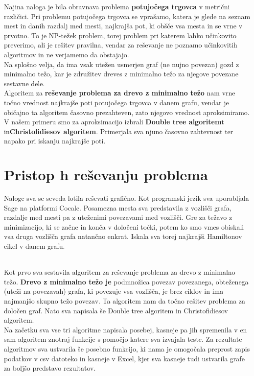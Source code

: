 \documentclass[12pt,a4paper]{amsart}
\theoremstyle{definition} %
\theoremstyle{plain} %
\begin{document}
Najina naloga je bila obravnava problema \textbf{potujočega trgovca} v metrični različici.
\newline
Pri problemu potujočega trgovca se vprašamo, katera je glede na seznam mest in danih razdalj med mesti, najkrajša pot, ki obšče vsa mesta in se vrne v prvotno. 
To je NP-težek problem, torej problem pri katerem lahko učinkovito preverimo, ali je rešitev pravilna, vendar za reševanje ne poznamo učinkovitih algoritmov in ne verjamemo da obstajajo. \\
Na splošno velja, da ima vsak utežen usmerjen graf (ne nujno povezan) gozd z minimalno težo, kar je združitev dreves z minimalno težo za njegove povezane sestavne dele.
\\
\newline
Algoritem za \textbf{reševanje problema za drevo z minimalno težo} nam vrne točno vrednost najkrajše poti potujočega trgovca  v danem grafu, vendar je običajno ta algoritem časovno prezahteven, zato njegovo vrednost aproksimiramo. 
V našem primeru smo za aproksimacijo izbrali \textbf{Double tree algoritem}t in\textbf{Christofidiesov algoritem}.
Primerjala sva njuno časovno zahtevnost ter napako pri iskanju najkrajše poti.
\bigskip

\newpage
\section{Pristop h reševanju problema}

Naloge sva se seveda lotila reševati grafično. Kot programski jezik sva uporabljala Sage na platformi Cocalc. \newline 
Posamezna mesta sva predstavila z vozlišči grafa, razdalje med mesti pa z uteženimi povezavami med vozlišči.  Gre za težavo z minimizacijo, ki se začne in konča v določeni točki, potem ko smo vmes obiskali vsa druga vozlišča grafa natančno enkrat.
Iskala sva torej najkrajši Hamiltonov cikel v danem grafu.
\hfil\\\

Kot prvo sva sestavila algoritem za reševanje problema za drevo z minimalno težo. \textbf{Drevo z minimalno težo je} podmnožica povezav povezanega, obteženega (uteži na povezavah) grafa, ki povezuje vsa vozlišča, je brez ciklov in ima najmanjšo skupno težo povezav.
Ta algoritem nam da točno rešitev problema za določen graf. Nato sva napisala še Double tree algoritem in Christofidiesov algoritem.
\\
Na začetku sva vse tri algoritme napisala posebej, kasneje pa jih spremenila v en sam algoritem znotraj funkcije s pomočjo katere sva izvajala teste.
Za rezultate algoritmov sva ustvarila še posebno funkcijo, ki nama je omogočala preprost zapis podatkov v csv datoteko in kasneje v Excel, kjer sva kasneje tudi ustvarila grafe za boljšo predstavo rezultatov.
\end{document}
